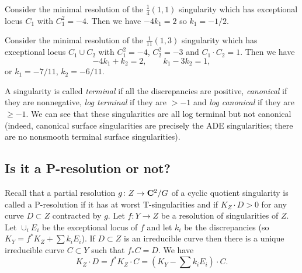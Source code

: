 \documentclass{article}
\begin{document}
\begin{Example}
Consider the minimal resolution of the \(\frac{1}{4}(1,1)\)
singularity which has exceptional locus \(C_1\) with
\(C_1^2=-4\). Then we have \(-4k_1=2\) so \(k_1=-1/2\).


\end{Example}
\begin{Example}
Consider the minimal resolution of the \(\frac{1}{11}(1,3)\)
singularity which has exceptional locus \(C_1\cup C_2\) with
\(C_1^2=-4\), \(C_2^2=-3\) and \(C_1\cdot C_2=1\). Then we have
\[-4k_1+k_2=2,\qquad k_1-3k_2=1,\] or \(k_1=-7/11\), \(k_2=-6/11\).


\end{Example}
\begin{Remark}
A singularity is called {\em terminal} if all the discrepancies are
positive, {\em canonical} if they are nonnegative, {\em log
terminal} if they are \(>-1\) and {\em log canonical} if they are
\(\geq -1\). We can see that these singularities are all log
terminal but not canonical (indeed, canonical surface singularities
are precisely the ADE singularities; there are no nonsmooth terminal
surface singularities).


\end{Remark}
\subsection{Is it a P-resolution or not?}


Recall that a partial resolution \(g\colon Z\to\mathbf{C}^2/G\) of a cyclic
quotient singularity is called a P-resolution if it has at worst
T-singularities and if \(K_Z\cdot D>0\) for any curve \(D\subset Z\)
contracted by \(g\). Let \(f\colon Y\to Z\) be a resolution of
singularities of \(Z\). Let \(\cup_iE_i\) be the exceptional locus of
\(f\) and let \(k_i\) be the discrepancies (so \(K_Y=f^*K_Z+\sum
k_iE_i\)). If \(D\subset Z\) is an irreducible curve then there is a
unique irreducible curve \(C\subset Y\) such that \(f_*C=D\). We have
\[K_Z\cdot D=f^*K_Z\cdot C=(K_Y-\sum k_iE_i)\cdot C.\]
\end{document}
